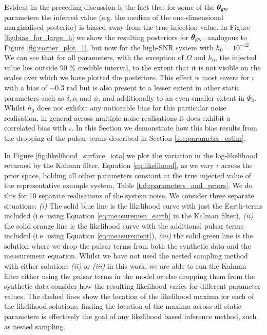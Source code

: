 \documentclass[fleqn,usenatbib,useAMS]{mnras}
\begin{document}
Evident in the preceding discussion is the fact that for some of the $\boldsymbol{\theta}_{\rm gw}$ parameters the inferred value (e.g. the median of the one-dimensional marginalised posterior) is biased away from the true injection value. In Figure \ref{fig:bias_for_large_h} we show the resulting posteriors for $\boldsymbol{\theta}_{\rm gw}$, analogous to Figure \ref{fig:corner_plot_1}, but now for the high-SNR system with $h_0 = 10^{-12}$. We can see that for all parameters, with the exception of $\Omega$ and $h_0$, the injected value lies outside 90 \% credible interval, to the extent that it is not visible on the scales over which we have plotted the posteriors. This effect is most severe for $\iota$ with a bias of $\sim 0.3$ rad but is also present to a lesser extent in other static parameters such as $\delta,\alpha$ and $\psi$, and additionally to an even smaller extent in $\Phi_0$. Whilst $h_0$ does not exhibit any noticeable bias for this particular noise realisation, in general across multiple noise realisations it does exhibit a correlated bias with $\iota$. In this Section we demonstrate how this bias results from the dropping of the pulsar terms described in Section \ref{sec:parameter_estim}. \newline 


In Figure \ref{fig:likelihood_surface_iota} we plot the variation in the log-likelihood returned by the Kalman filter, Equation \eqref{eq:likelihood}, as we vary $\iota$ across the prior space, holding all other parameters constant at the true injected value of the representative example system, Table \ref{tab:parameters_and_priors}. We do this for 10 separate realisations of the system noise. We consider three separate situations: \textit{(i)} The solid blue line is the likelihood curve with just the Earth-terms included (i.e. using Equation \ref{eq:measuremen_earth} in the Kalman filter), \textit{(ii)} the solid orange line is the likelihood curve with the additional pulsar terms included (i.e. using Equation \ref{eq:measurement}), \textit{(iii)} the solid green line is the solution where we drop the pulsar terms from both the synthetic data and the measurement equation. Whilst we have not used the nested sampling method with either solutions \textit{(ii)} or \textit{(iii)} in this work, we are able to run the Kalman filter either using the pulsar terms in the model or else dropping them from the synthetic data consider how the resulting likelihood varies for different parameter values. The dashed lines show the location of the likelihood maxima for each of the likelihood solutions; finding the location of the maxima across all static parameters is effectively the goal of any likelihood based inference method, such as nested sampling. \newline  
\end{document}
